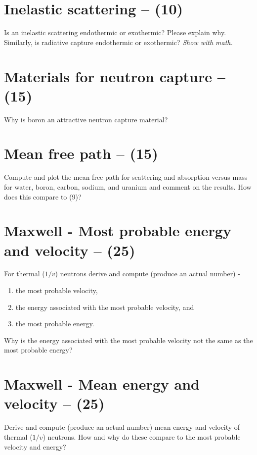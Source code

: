 \documentclass[11pt,a4paper]{article}
\begin{document}
\newpage

\section{Inelastic scattering -- (10)}
Is an inelastic scattering endothermic or exothermic? Please explain why. Similarly, is radiative capture endothermic or exothermic? \textit{Show with math.}





\newpage

\section{Materials for neutron capture -- (15)}
Why is boron an attractive neutron capture material?





\newpage

\section{Mean free path -- (15)}
Compute and plot the mean free path for scattering and absorption versus mass for water, boron, carbon, sodium, and uranium and comment on the results. How does this compare to (9)?





\newpage

\section{Maxwell - Most probable energy and velocity -- (25)}
For thermal ($1/v$) neutrons derive and compute (produce an actual number) - 
\begin{enumerate}
    \item the most probable velocity,
    \item the energy associated with the most probable velocity, and 
    \item the most probable energy.
\end{enumerate}

Why is the energy associated with the most probable velocity not the same as the most probable energy?





\newpage

\section{Maxwell - Mean energy and velocity -- (25)}
Derive and compute (produce an actual number) mean energy and velocity of thermal ($1/v$) neutrons. How and why do these compare to the most probable velocity and energy?
\end{document}
